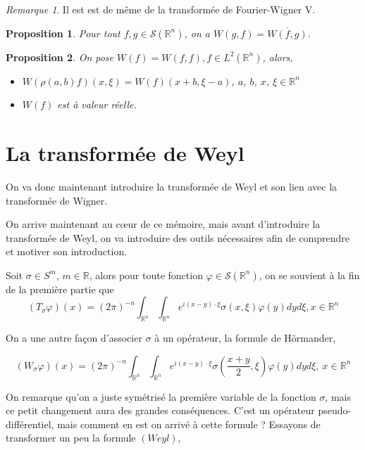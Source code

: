 \documentclass[a4paper, 12pt]{report}
\newcommand{\R}{\mathbb{R}} %
\renewcommand{\.}{\cdot} %
\theoremstyle{break}
\newtheorem{proposition}{Proposition}
\theoremstyle{remark}
\newtheorem{remark}{Remarque}
\theoremstyle{proofstyle}
\begin{document}
\begin{remark}
    Il est est de même de la transformée de Fourier-Wigner V.
\end{remark}

\begin{proposition}
    Pour tout $f, g \in \mathcal{S}(\R^n)$, on a $W(g,f) = \overline{W(f,g)}$.
\end{proposition}

\begin{proposition}%
    On pose $W(f) = W(f,f), f \in L^2(\R^n)$, alors, \vspace{3pt}
    \begin{itemize}
        \item $W(\rho(a,b)f)(x, \xi) = W(f)(x+b, \xi-a)$, $a$, $b$, $x$, $\xi \in \R^n$
        \item $W(f)$ est à valeur réelle.
    \end{itemize}
\end{proposition}



\section{La transformée de Weyl} %

On va donc maintenant introduire la transformée de Weyl et son lien avec la transformée de Wigner.

On arrive maintenant au c\oe ur de ce mémoire, mais avant d'introduire la transformée de Weyl, on va introduire des outils nécessaires afin de comprendre et motiver son introduction.\vspace{5pt}

Soit $\sigma \in S^m$, $m \in \R$, alors pour toute fonction $\varphi \in \mathcal{S} (\R^n)$, on se souvient à la fin de la première partie que
$$(T_\sigma \varphi)(x) = (2 \pi) ^{-n} \int_{\R^n} \int_{\R^n} e^{i(x-y) \. \xi} \sigma (x, \xi) \varphi(y) dy d\xi, x \in \R ^n$$\vspace{5pt}

On a une autre façon d'associer $\sigma$ à un opérateur, la formule de Hörmander,

$$(W_\sigma \varphi)(x) = (2 \pi) ^{-n} \int_{\R^n} \int_{\R^n} e^{i(x-y) \. \xi} \sigma \left(\frac{x+y}{2}, \xi\right) \varphi(y) dy d\xi,~ x \in \R ^n$$

On remarque qu'on a juste symétrisé la première variable de la fonction $\sigma$, mais ce petit changement aura des grandes conséquences. C'est un opérateur pseudo-différentiel, mais comment en est on arrivé à cette formule ? Essayons de transformer un peu la formule $(Weyl)$,
\end{document}
